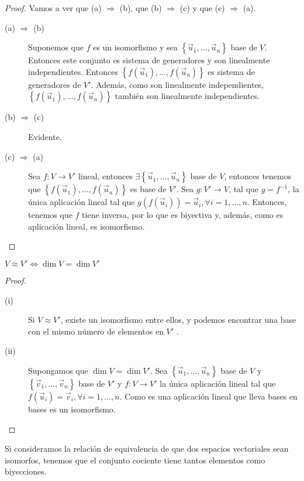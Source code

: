 \begin{proof} Vamos a ver que (a) $\displaystyle \Rightarrow $ (b), que (b) $\displaystyle \Rightarrow $ (c) y que (c) $\displaystyle \Rightarrow $ (a). 
\begin{description}
	\item[(a) $\displaystyle \Rightarrow $ (b) ] Suponemos que $\displaystyle f $ es un isomorfismo y sea $\displaystyle \left\{ \vec{u}_{1}, \ldots, \vec{u}_{n}\right\}  $ base de $\displaystyle V $. Entonces este conjunto es sistema de generadores y son linealmente independientes. Entonces $\displaystyle \left\{ f\left(\vec{u}_{1}\right), \ldots , f\left(\vec{u}_{n}\right)\right\}  $ es sistema de generadores de $\displaystyle V' $. Además, como son linealmente independientes, $\displaystyle \left\{ f\left(\vec{u}_{1}\right), \ldots, f\left(\vec{u}_{n}\right)\right\}  $ también son linealmente independientes. 
	\item[(b) $\displaystyle \Rightarrow $ (c)] Evidente.
	\item[(c) $\displaystyle \Rightarrow $ (a)] Sea $\displaystyle f : V \to V' $ lineal, entonces $\displaystyle \exists \left\{ \vec{u}_{1}, \ldots, \vec{u}_{n}\right\}  $ base de $\displaystyle V $, entonces tenemos que $\displaystyle \left\{ f\left(\vec{u}_{1}\right), \ldots, f\left(\vec{u}_{n}\right)\right\}  $ es base de $\displaystyle V' $. Sea $\displaystyle g : V' \to V $, tal que $\displaystyle g = f^{-1} $, la única aplicación lineal tal que $\displaystyle g\left(f\left(\vec{u}_{i}\right)\right) = \vec{u}_{i}, \forall i = 1, \ldots, n$. Entonces, tenemos que $\displaystyle f $ tiene inversa, por lo que es biyectiva y, además, como es aplicación lineal, es isomorfismo.
\end{description}
\end{proof}

\begin{fcolorary}[]
\normalfont $\displaystyle V \approx V' \iff \dim V = \dim V' $ 
\end{fcolorary}

\begin{proof}
\begin{description}
\item[(i)] Si $\displaystyle V \approx V' $, existe un isomorfismo entre ellos, y podemos encontrar una base con el mismo número de elementos en $\displaystyle V' $ .
\item[(ii)]  Supongamos que $\displaystyle \dim V = \dim V' $. Sea $\displaystyle \left\{ \vec{u}_{1}, \ldots, \vec{u}_{n}\right\}  $ base de $\displaystyle V $ y $\displaystyle \left\{ \vec{v}_{1}, \ldots, \vec{v}_{n}\right\}  $ base de $\displaystyle V' $ y $\displaystyle f: V \to V' $ la única aplicación lineal tal que $\displaystyle f\left(\vec{u}_{i}\right) = \vec{v}_{i}, \forall i = 1, \ldots, n $. Como es una aplicación lineal que lleva bases en bases es un isomorfismo. 
\end{description}
\end{proof}

\begin{observation}
\normalfont Si consideramos la relación de equivalencia de que dos espacios vectoriales sean isomorfos, tenemos que el conjunto cociente tiene tantos elementos como biyecciones.
\end{observation}

